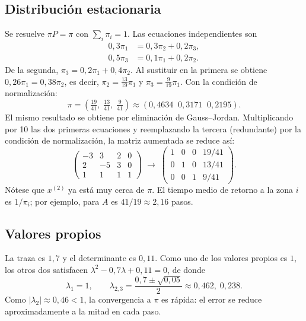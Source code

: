 \documentclass[12pt]{article}
\begin{document}
\subsection{Distribución estacionaria}
Se resuelve $\pi P=\pi$ con $\sum_i\pi_i=1$. Las ecuaciones independientes son
\begin{align*}
    0{,}3\pi_1 & =0{,}3\pi_2+0{,}2\pi_3, \\
    0{,}5\pi_3 & =0{,}1\pi_1+0{,}2\pi_2.
\end{align*}
De la segunda, $\pi_3=0{,}2\pi_1+0{,}4\pi_2$. Al sustituir en la primera se obtiene
$0{,}26\pi_1=0{,}38\pi_2$, es decir, $\pi_2=\tfrac{13}{19}\pi_1$ y $\pi_3=\tfrac{9}{19}\pi_1$.
Con la condición de normalización:
\[
    \pi=\left(\tfrac{19}{41},\;\tfrac{13}{41},\;\tfrac{9}{41}\right)\approx
    (0{,}4634\;\;0{,}3171\;\;0{,}2195).
\]
El mismo resultado se obtiene por eliminación de Gauss--Jordan. Multiplicando por 10 las dos primeras ecuaciones y reemplazando la tercera (redundante) por la condición de normalización, la matriz aumentada se reduce así:
\[
    \left(\begin{array}{ccc|c}
        -3 & 3  & 2 & 0 \\
        2  & -5 & 3 & 0 \\
        1  & 1  & 1 & 1
    \end{array}\right)
    \;\longrightarrow\;
    \left(\begin{array}{ccc|c}
        1 & 0 & 0 & 19/41 \\
        0 & 1 & 0 & 13/41 \\
        0 & 0 & 1 & 9/41
    \end{array}\right).
\]
Nótese que $x^{(2)}$ ya está muy cerca de $\pi$. El tiempo medio de retorno a la zona $i$ es
$1/\pi_i$; por ejemplo, para $A$ es $41/19\approx 2{,}16$ pasos.

\subsection{Valores propios}
La traza es $1{,}7$ y el determinante es $0{,}11$. Como uno de los valores propios es $1$, los
otros dos satisfacen $\lambda^2-0{,}7\lambda+0{,}11=0$, de donde
\[
    \lambda_1=1,\qquad \lambda_{2,3}=\frac{0{,}7\pm\sqrt{0{,}05}}{2}\approx 0{,}462,\;0{,}238.
\]
Como $|\lambda_2|\approx 0{,}46<1$, la convergencia a $\pi$ es rápida: el error se reduce
aproximadamente a la mitad en cada paso.
\newpage
\end{document}
